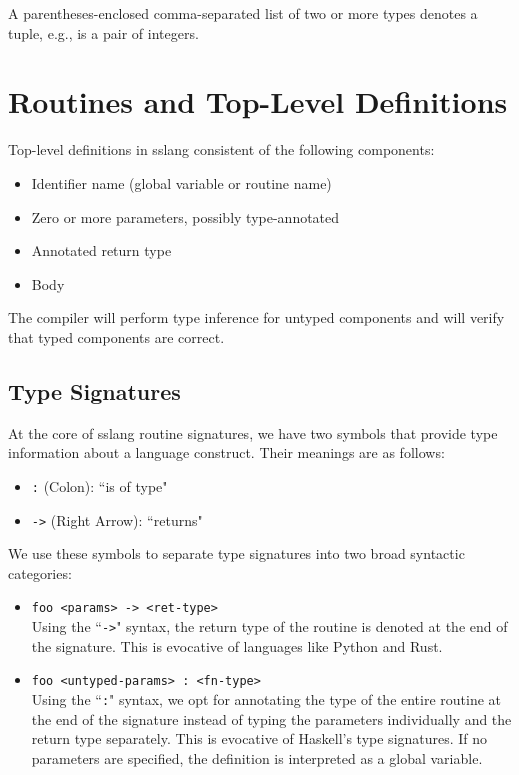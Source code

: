 \documentclass{article}
\begin{document}
A parentheses-enclosed comma-separated list of two or more types
denotes a tuple, e.g., \lit*{(}  \lit*{,} 
\lit*{)} is a pair of integers.

\section{Routines and Top-Level Definitions}
Top-level definitions in sslang consistent of the following components:
\begin{itemize}
    \item Identifier name (global variable or routine name)
    \item Zero or more parameters, possibly type-annotated
    \item Annotated return type
    \item Body
\end{itemize}
The compiler will perform type inference for untyped components and will verify that typed components are correct.

\subsection{Type Signatures}
At the core of sslang routine signatures, we have two symbols that provide type information about a language construct. Their meanings are as follows:
\begin{itemize}
    \item \texttt{:} (Colon): ``is of type"
    \item \texttt{->} (Right Arrow): ``returns"
\end{itemize}

We use these symbols to separate type signatures into two broad syntactic categories:
\begin{itemize}
    \item \texttt{foo <params> -> <ret-type>}\\
          Using the ``\texttt{->}" syntax, the return type of the routine is denoted at the end of the signature. This is evocative of languages like Python and Rust.
    \item \texttt{foo <untyped-params> : <fn-type>}\\
          Using the ``\texttt{:}" syntax, we opt for annotating the type of the entire routine at the end of the signature instead of typing the parameters individually and the return type separately. This is evocative of Haskell's type signatures. If no parameters are specified, the definition is interpreted as a global variable.
\end{itemize}
\end{document}
